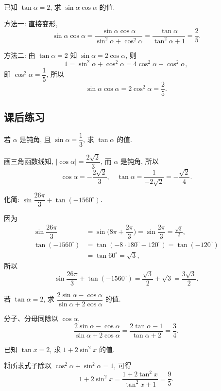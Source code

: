 \begin{exercise}
    已知 $\tan\alpha =2$, 求 $\sin\alpha \cos\alpha$ 的值.
\end{exercise}
\beginsolution
    方法一: 直接变形,
    \[\sin\alpha \cos\alpha
        = \frac{\sin\alpha \cos\alpha}{\sin^2\alpha+ \cos^2\alpha}
        = \frac{\tan\alpha}{\tan^2\alpha+1}
        = \frac25.\]

    方法二: 由 $\tan\alpha =2$ 知 $\sin\alpha= 2\cos\alpha$, 则
    \[1= \sin^2\alpha+ \cos^2\alpha= 4\cos^2\alpha+ \cos^2\alpha,\]
    即 $\cos^2\alpha= \dfrac15$, 所以
    \[\sin\alpha \cos\alpha= 2\cos^2\alpha= \frac25.\]
\endsolution

\subsection{课后练习}
\begin{exercise}
    若 $\alpha$ 是钝角, 且 $\sin\alpha =\dfrac13$, 求 $\tan\alpha $ 的值.
\end{exercise}
\beginsolution
    画三角函数线知, $|\cos\alpha|= \dfrac{2\sqrt2}{3}$, 而 $\alpha$ 是钝角, 所以 
    \[\cos\alpha= -\dfrac{2\sqrt2}{3},\quad
        \tan\alpha= \frac1{-2\sqrt2}= -\frac{\sqrt2}{4}.\]
\endsolution

\begin{exercise}
    化简: $\sin\dfrac{26\pi}3+ \tan(-1560^\circ)$.
\end{exercise}
\beginsolution
    因为
    \[\begin{aligned}
        \sin\dfrac{26\pi}3
        &= \sin\biggl(8\pi+ \dfrac{2\pi}3\biggr)
         = \sin\dfrac{2\pi}3= \frac{\sqrt3}{2},\\
        \tan(-1560^\circ)
        &= \tan(-8\cdot 180^\circ- 120^\circ)
         = \tan(-120^\circ)\\
        &= \tan 60^\circ= \sqrt3,
    \end{aligned}\]
    所以
    \[\sin\dfrac{26\pi}3+ \tan(-1560^\circ)
        = \frac{\sqrt3}{2}+ \sqrt{3}
        = \frac{3\sqrt3}{2}.\]
\endsolution

\begin{exercise}
    若 $\tan\alpha =2$, 求 $\dfrac{2\sin\alpha- \cos\alpha}{\sin\alpha+ 2\cos\alpha}$ 的值.
\end{exercise}
\beginsolution
    分子、分母同除以 $\cos\alpha$, 
    \[\dfrac{2\sin\alpha- \cos\alpha}{\sin\alpha+ 2\cos\alpha}
        = \frac{2\tan\alpha-1}{\tan\alpha+2}
        = \frac34.\]
\endsolution

\begin{exercise}
    已知 $\tan x=2$, 求 $1+2\sin^2 x$ 的值.
\end{exercise}
\beginsolution
    将所求式子除以 $\cos^2\alpha+\sin^2\alpha=1$, 可得
    \[1+2\sin^2 x= \frac{1+2\tan^2 x}{\tan^2 x+1}= \frac95.\]
\endsolution

